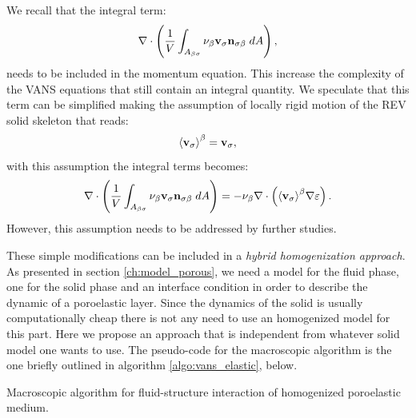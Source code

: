 We recall that the integral term: $$\nabla \cdot \left( \dfrac{1}{V} \displaystyle\int_{A_{\beta \sigma}}  \nu_{\beta} \textbf{v}_{\sigma} \mathbf{n}_{\sigma \beta} \;dA \right),$$ needs to be included in the momentum equation. This increase the complexity of the VANS equations that still contain an integral quantity. We speculate that this term can be simplified making the assumption of locally rigid motion of the REV solid skeleton that reads:
$$
{\left< \textbf{v}_{\sigma} \right>}^{\beta} = \textbf{v}_{\sigma},
$$
\noindent with this assumption the integral terms becomes:
$$
\nabla \cdot \left( \dfrac{1}{V} \displaystyle\int_{A_{\beta \sigma}}  \nu_{\beta} \textbf{v}_{\sigma} \mathbf{n}_{\sigma \beta} \;dA \right) = - \nu_{\beta} \nabla \cdot \left( {\left< \textbf{v}_{\sigma} \right>}^{\beta} \nabla \varepsilon \right).
$$
However, this assumption needs to be addressed by further studies.

These simple modifications can be included in a \textit{hybrid homogenization approach}. As presented in section \ref{ch:model_porous}, we need a model for the fluid phase, one for the solid phase and an interface condition in order to describe the dynamic of a poroelastic layer. Since the dynamics of the solid is usually computationally cheap there is not any need to use an homogenized model for this part. Here we propose an approach that is independent from whatever solid model one wants to use. The pseudo-code for the macroscopic algorithm is the one briefly outlined in algorithm  \ref{algo:vans_elastic}, below.
\vspace{0.5cm}

\begin{algorithm}[H]
	\caption{Macroscopic algorithm for fluid-structure interaction of homogenized poroelastic medium.}
	\label{algo:vans_elastic}
\end{algorithm}

